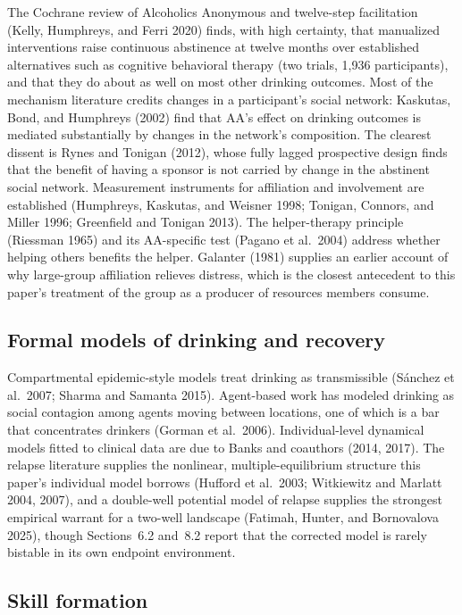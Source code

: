 \documentclass[11pt,a4paper]{article}
\begin{document}
The Cochrane review of Alcoholics Anonymous and twelve-step facilitation (Kelly,
Humphreys, and Ferri 2020) finds, with high certainty, that manualized interventions
raise continuous abstinence at twelve months over established alternatives such as
cognitive behavioral therapy (two trials, 1,936 participants), and that they do about
as well on most other drinking outcomes. Most of the mechanism literature credits
changes in a participant's social network: Kaskutas, Bond, and Humphreys (2002) find
that AA's effect on drinking outcomes is mediated substantially by changes in the
network's composition. The clearest dissent is Rynes and Tonigan (2012), whose fully
lagged prospective design finds that the benefit of having a sponsor is not carried
by change in the abstinent social network. Measurement instruments for affiliation and
involvement are established (Humphreys, Kaskutas, and Weisner 1998; Tonigan,
Connors, and Miller 1996; Greenfield and Tonigan 2013). The helper-therapy
principle (Riessman 1965) and its AA-specific test (Pagano et al.\ 2004) address
whether helping others benefits the helper. Galanter (1981) supplies an earlier
account of why large-group affiliation relieves distress, which is the closest
antecedent to this paper's treatment of the group as a producer of resources
members consume.

\subsection{Formal models of drinking and recovery}

Compartmental epidemic-style models treat drinking as transmissible (S\'anchez et
al.\ 2007; Sharma and Samanta 2015). Agent-based work has modeled drinking as social
contagion among agents moving between locations, one of which is a bar that
concentrates drinkers (Gorman et al.\ 2006).
Individual-level dynamical models fitted to clinical data are due to Banks and
coauthors (2014, 2017). The relapse literature supplies the nonlinear,
multiple-equilibrium structure this paper's individual model borrows (Hufford et
al.\ 2003; Witkiewitz and Marlatt 2004, 2007), and a double-well potential model of
relapse supplies the strongest empirical warrant for a two-well landscape (Fatimah,
Hunter, and Bornovalova 2025), though Sections~6.2 and~8.2 report that the corrected
model is rarely bistable in its own endpoint environment.

\subsection{Skill formation}
\end{document}
